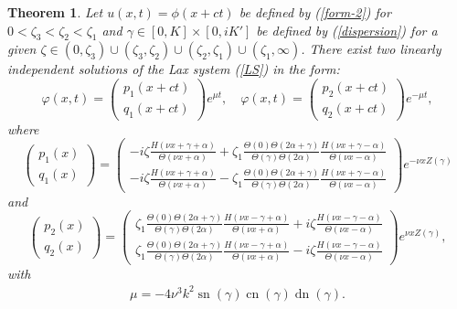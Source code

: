 \documentclass[12pt,reqno]{amsart}
\numberwithin{equation}{section}
\DeclareMathOperator{\sn}{sn}
\DeclareMathOperator{\cn}{cn}
\DeclareMathOperator{\dn}{dn}
\newtheorem{theorem}{Theorem}
\begin{document}
\begin{theorem}
	\label{th-main}
	Let $u(x,t) = \phi(x+ct)$ be defined by (\ref{form-2}) for $0 < \zeta_3 < \zeta_2 < \zeta_1$ and $\gamma \in [0,K]  \times [0,iK']$ be defined by (\ref{dispersion}) for a given $\zeta \in (0,\zeta_3) \cup (\zeta_3,\zeta_2) \cup (\zeta_2,\zeta_1) \cup (\zeta_1,\infty)$. There exist two linearly independent solutions of the Lax system (\ref{LS}) in the form:
	\begin{equation}
	\label{eigenfunction-time}
	\varphi(x,t) = \left( \begin{matrix} p_1(x+ct)  \\ q_1(x+ct) \end{matrix} \right) e^{\mu t}, \quad \varphi(x,t) = \left( \begin{matrix} p_2(x+ct)  \\ q_2(x+ct) \end{matrix} \right) e^{-\mu t},
	\end{equation}
	where
	\begin{equation}
	\label{Lame-sol-1-fin}
	\left( \begin{matrix} p_1(x) \\ q_1(x) \end{matrix} \right) = 
	\left( \begin{matrix}  -i\zeta\frac{H(\nu x + \gamma + \alpha)}{\Theta(\nu x + \alpha)} + \zeta_1 \frac{\Theta(0) \Theta(2\alpha + \gamma)}{\Theta(\gamma) \Theta(2\alpha)} \frac{H(\nu x + \gamma - \alpha)}{\Theta(\nu x - \alpha)} \\
	-i\zeta\frac{H(\nu x + \gamma + \alpha)}{\Theta(\nu x + \alpha)} - \zeta_1 \frac{\Theta(0) \Theta(2\alpha + \gamma)}{\Theta(\gamma) \Theta(2\alpha)} \frac{H(\nu x + \gamma - \alpha)}{\Theta(\nu x - \alpha)} \end{matrix} \right) 
	e^{-\nu x Z(\gamma)}
	\end{equation}
	and
	\begin{equation}
	\label{Lame-sol-2-fin}
	\left( \begin{matrix} p_2(x) \\ q_2(x) \end{matrix} \right) = 
	\left( \begin{matrix}  \zeta_1 \frac{\Theta(0) \Theta(2\alpha + \gamma)}{\Theta(\gamma) \Theta(2\alpha)}\frac{H(\nu x - \gamma + \alpha)}{\Theta(\nu x + \alpha)} +  i\zeta \frac{H(\nu x - \gamma - \alpha)}{\Theta(\nu x - \alpha)} \\ 
	\zeta_1 \frac{\Theta(0) \Theta(2\alpha + \gamma)}{\Theta(\gamma) \Theta(2\alpha)}\frac{H(\nu x - \gamma + \alpha)}{\Theta(\nu x + \alpha)} -  i\zeta \frac{H(\nu x - \gamma - \alpha)}{\Theta(\nu x - \alpha)} \end{matrix} \right) e^{\nu x Z(\gamma)},
	\end{equation}
with
	\begin{align}
	\label{omega}
	\mu = -4 \nu^3 k^2 \sn(\gamma) \cn(\gamma) \dn(\gamma).  
	\end{align}
\end{theorem}
\end{document}
